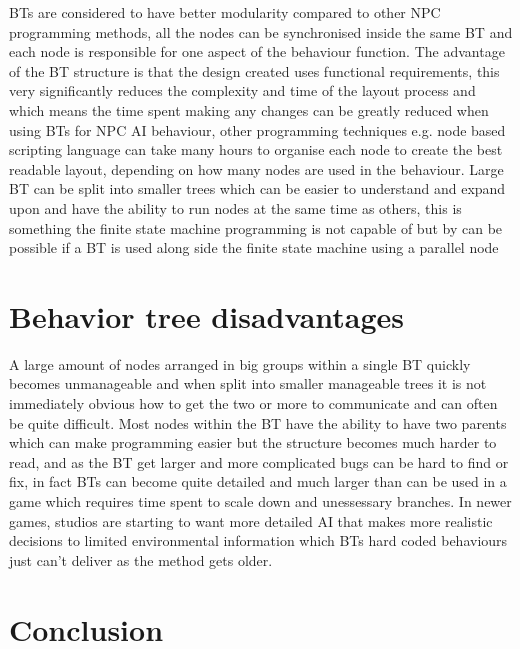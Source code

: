\documentclass{scrartcl}
\begin{document}
BTs are considered to have better modularity compared to other NPC programming methods, all the nodes can be synchronised inside the same BT and each node is responsible for one aspect of the behaviour function\cite{colledanchise2015learning}. The advantage of the BT structure is that the design created uses functional requirements, this very significantly reduces the complexity and time of the layout process and which means the time spent making any changes can be greatly reduced when using BTs for NPC AI behaviour\cite{dromey2003requirements}, other programming techniques e.g. node based scripting language can take many hours to organise each node to create the best readable layout, depending on how many nodes are used in the behaviour. Large BT can be split into smaller trees which can be easier to understand and expand upon\cite{marzinotto2014towards} and have the ability to run nodes at the same time as others, this is something the finite state machine programming is not capable of but by can be possible if a BT is used along side the finite state machine using a parallel node\cite{SCIRRA}

\section{Behavior tree disadvantages}

A large amount of nodes arranged in big groups within a single BT quickly becomes unmanageable and when split into smaller manageable trees it is not immediately obvious how to get the two or more to communicate\cite{dromey2003requirements} and can often be quite difficult\cite{hmc}. Most nodes within the BT have the ability to have two parents which can make programming easier but the structure becomes much harder to read\cite{marzinotto2014towards}, and as the BT get larger and more complicated bugs can be hard to find or fix\cite{GDCVault}, in fact BTs can become quite detailed and much larger than can be used in a game which requires time spent to scale down and unessessary branches. In newer games, studios are starting to want more detailed AI that makes more realistic decisions to limited environmental information which BTs hard coded behaviours just can't deliver as the method gets older\cite{Gama}.

\section{Conclusion}
\end{document}
